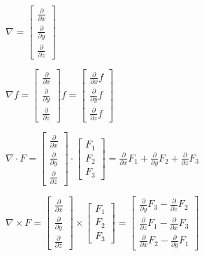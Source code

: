 \documentclass{article}
\begin{document}
$\nabla =\left[ 
\begin{array}{c}
\frac{\partial }{\partial x} \\ 
\frac{\partial }{\partial y} \\ 
\frac{\partial }{\partial z}%
\end{array}%
\right] $

$\nabla f=\left[ 
\begin{array}{c}
\frac{\partial }{\partial x} \\ 
\frac{\partial }{\partial y} \\ 
\frac{\partial }{\partial z}%
\end{array}%
\right] f=\left[ 
\begin{array}{c}
\frac{\partial }{\partial x}f \\ 
\frac{\partial }{\partial y}f \\ 
\frac{\partial }{\partial z}f%
\end{array}%
\right] $

$\nabla \cdot F=\left[ 
\begin{array}{c}
\frac{\partial }{\partial x} \\ 
\frac{\partial }{\partial y} \\ 
\frac{\partial }{\partial z}%
\end{array}%
\right] \cdot \left[ 
\begin{array}{c}
F_{1} \\ 
F_{2} \\ 
F_{3}%
\end{array}%
\right] =\frac{\partial }{\partial x}F_{1}+\frac{\partial }{\partial y}F_{2}+%
\frac{\partial }{\partial z}F_{3}$

$\nabla \times F=\left[ 
\begin{array}{c}
\frac{\partial }{\partial x} \\ 
\frac{\partial }{\partial y} \\ 
\frac{\partial }{\partial z}%
\end{array}%
\right] \times \left[ 
\begin{array}{c}
F_{1} \\ 
F_{2} \\ 
F_{3}%
\end{array}%
\right] =\left[ 
\begin{array}{c}
\frac{\partial }{\partial y}F_{3}-\frac{\partial }{\partial z}F_{2} \\ 
\frac{\partial }{\partial z}F_{1}-\frac{\partial }{\partial x}F_{3} \\ 
\frac{\partial }{\partial x}F_{2}-\frac{\partial }{\partial y}F_{1}%
\end{array}%
\right] $
\end{document}

